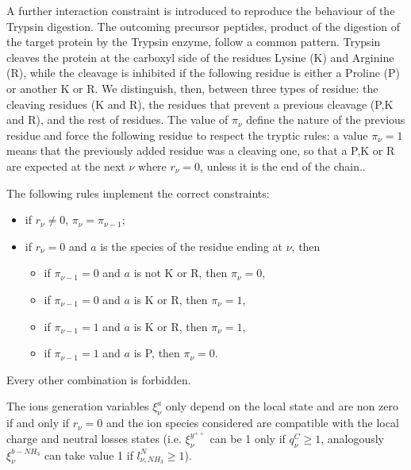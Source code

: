 A further interaction constraint is introduced to reproduce
the behaviour of the Trypsin digestion. The outcoming 
precursor peptides, product of the digestion of the target protein
by the Trypsin enzyme, follow a common pattern.
Trypsin cleaves the protein at the carboxyl side of the residues
Lysine (K) and Arginine (R),
while the cleavage is inhibited if the following residue is either a 
Proline (P) or another K or R.
We distinguish, then, between three types of residue: the cleaving residues (K and R),
the residues that prevent a previous cleavage (P,K and R), and the rest
of residues. 
The value of $\pi_\nu$ define the nature of the previous residue and force
the following residue to respect the tryptic rules: a value $\pi_\nu=1$  means that
the previously added residue was a cleaving one, so that  a P,K or R
are expected at the next $\nu$ where $r_\nu=0$, unless it is the end of the chain..

The following rules implement the correct constraints:
\begin{itemize}
 \item if $r_\nu \neq 0$, $\pi_\nu=\pi_{\nu-1}$;
\item if $r_\nu = 0$ and $a$ is the species of the residue ending at $\nu$, then 
\begin{itemize}
\item if $\pi_{\nu-1}=0$ and $a$ is not K or R, then $\pi_\nu=0$,
\item if $\pi_{\nu-1}=0$ and $a$ is  K or R, then $\pi_\nu=1$,
\item if $\pi_{\nu-1}=1$ and $a$ is  K or R, then $\pi_\nu=1$,
\item if $\pi_{\nu-1}=1$ and $a$ is P, then $\pi_\nu=0$.
\end{itemize}
\end{itemize}
Every other combination is forbidden.

The ions generation variables $\xi^{a}_\nu$ only depend on the local state and
are non zero if and only if $r_\nu=0$ and the ion species considered are
compatible with the local charge and neutral losses states (i.e. $\xi^{y^{++}}_\nu$
can be 1 only if $q^C_\nu\ge 1$, %
 analogously $\xi^{b-NH_3}_\nu$ can take value 1
if $l^N_{\nu,NH_3}\ge1$).

